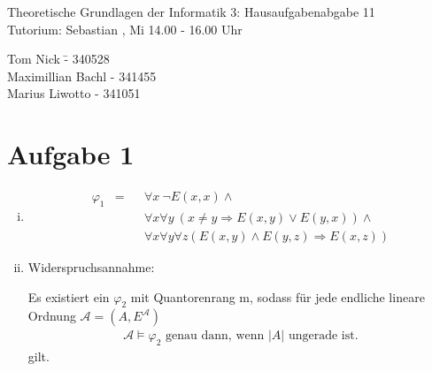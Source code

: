 \documentclass[a4paper,10pt]{article}
\begin{document}
\begin{center}
\Large{Theoretische Grundlagen der Informatik 3: Hausaufgabenabgabe 11} \\
\large{Tutorium: Sebastian , Mi 14.00 - 16.00 Uhr}
\end{center}
\begin{tabbing}
Tom Nick \hspace{2cm}\= - 340528\\
Maximillian Bachl \> - 341455 \\
Marius Liwotto\> -  341051
\end{tabbing}
\section*{Aufgabe 1}
	\begin{enumerate}[(i)]
		\item 
			\begin{align*}
				\varphi_1 &= &&\forall x~ \neg E(x,x) \wedge \\
				&&&\forall x \forall y~ 
				(x \neq y \Rightarrow E(x,y) \vee E(y,x)) \wedge  \\
				&&&\forall x \forall y \forall z (E(x,y) \wedge E(y,z) \Rightarrow E(x,z))
			\end{align*}
			
		\item
			Widerspruchsannahme:
			
			Es existiert ein $\varphi_2$ mit Quantorenrang m, sodass für jede endliche lineare Ordnung $\mathcal{A} = (A,E^{\mathcal{A}})$ 
			\begin{align*}
				\mathcal{A} \vDash \varphi_2 \text{ genau dann, wenn $|A|$ ungerade ist.}
			\end{align*}
			gilt.
			

\end{enumerate}
\end{document}

